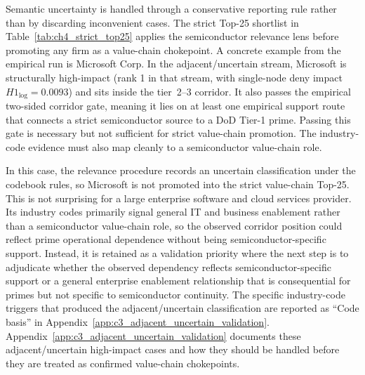 Semantic uncertainty is handled through a conservative reporting rule rather than by discarding inconvenient cases. The strict Top-25 shortlist in Table~\ref{tab:ch4_strict_top25} applies the semiconductor relevance lens before promoting any firm as a value-chain chokepoint. A concrete example from the empirical run is Microsoft Corp. In the adjacent/uncertain stream, Microsoft is structurally high-impact (rank 1 in that stream, with single-node deny impact $H1_{\log}=0.0093$) and sits inside the tier~2--3 corridor. It also passes the empirical two-sided corridor gate, meaning it lies on at least one empirical support route that connects a strict semiconductor source to a DoD Tier-1 prime. Passing this gate is necessary but not sufficient for strict value-chain promotion. The industry-code evidence must also map cleanly to a semiconductor value-chain role.

In this case, the relevance procedure records an uncertain classification under the codebook rules, so Microsoft is not promoted into the strict value-chain Top-25. This is not surprising for a large enterprise software and cloud services provider. Its industry codes primarily signal general IT and business enablement rather than a semiconductor value-chain role, so the observed corridor position could reflect prime operational dependence without being semiconductor-specific support. Instead, it is retained as a validation priority where the next step is to adjudicate whether the observed dependency reflects semiconductor-specific support or a general enterprise enablement relationship that is consequential for primes but not specific to semiconductor continuity. The specific industry-code triggers that produced the adjacent/uncertain classification are reported as ``Code basis'' in Appendix~\ref{app:c3_adjacent_uncertain_validation}. Appendix~\ref{app:c3_adjacent_uncertain_validation} documents these adjacent/uncertain high-impact cases and how they should be handled before they are treated as confirmed value-chain chokepoints.

